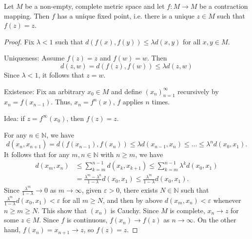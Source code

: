 \documentclass[a4paper]{article}
\begin{document}
\begin{theorem}
    Let $M$ be a non-empty, complete metric space and let $f: M \rightarrow M$ be a contraction mapping. Then $f$ has a unique fixed point, i.e. there is a unique $z \in M$ such that $f(z)=z$. 
\end{theorem}
\begin{proof}
    Fix $\lambda<1$ such that $d(f(x), f(y)) \leqslant \lambda d(x, y)$ for all $x, y \in M$.

    Uniqueness: Assume $f(z)=z$ and $f(w)=w$. Then
    \[
    d(z, w)=d(f(z), f(w)) \leqslant \lambda d(z, w)
    \]
    Since $\lambda<1$, it follows that $z=w$. 

    Existence: Fix an arbitrary $x_0 \in M$ and define $\left(x_n\right)_{n=1}^{\infty}$ recursively by $x_n=f\left(x_{n-1}\right)$. Thus, $x_n=f^n(x)$, $f$ applies $n$ times.

    Idea: if $z= f^{\infty}(x_0)$, then $f(z)=z$.

    For any $n \in \mathbb{N}$, we have
    \[
    d\left(x_n, x_{n+1}\right)=d\left(f\left(x_{n-1}\right), f\left(x_n\right)\right) \leqslant \lambda d\left(x_{n-1}, x_n\right) \leqslant \ldots \leqslant \lambda^n d\left(x_0, x_1\right).
    \]
    It follows that for any $m, n \in \mathbb{N}$ with $n \geqslant m$, we have
    \begin{align*}
        d\left(x_m, x_n\right) &\leqslant \sum_{k=m}^{n-1} d\left(x_k, x_{k+1}\right) \leqslant \sum_{k=m}^{n-1} \lambda^k d\left(x_0, x_1\right)\\ 
        &=\frac{\lambda^m-\lambda^n}{1-\lambda} d\left(x_0, x_1\right) \leqslant \frac{\lambda^m}{1-\lambda} d\left(x_0, x_1\right).
    \end{align*}
    Since $\frac{\lambda^m}{1-\lambda} \rightarrow 0$ as $m \rightarrow \infty$, given $\varepsilon>0$, there exists $N \in \mathbb{N}$ such that $\frac{\lambda^m}{1-\lambda} d\left(x_0, x_1\right)<\varepsilon$ for all $m \geqslant N$, and then by above $d\left(x_m, x_n\right)<\varepsilon$ whenever $n \geqslant m \geqslant N$. This show that $\left(x_n\right)$ is Cauchy. Since $M$ is complete, $x_n \rightarrow z$ for some $z \in M$.
    Since $f$ is continuous, $f\left(x_n\right) \rightarrow f(z)$ as $n \rightarrow \infty$. On the other hand, $f\left(x_n\right)=x_{n+1} \rightarrow z$, so $f(z)=z$.
\end{proof}
\end{document}
